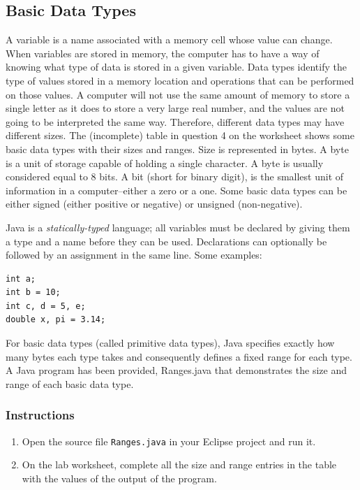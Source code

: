 \documentclass[12pt]{scrartcl}
\begin{document}
\subsection{Basic Data Types}

A variable is a name associated with a memory cell whose value can change. 
When variables are stored in memory, the computer has to have a way of 
knowing what type of data is stored in a given variable.  Data types identify 
the type of values stored in a memory location and operations that can be 
performed on those values.  A computer will not use the same amount of 
memory to store a single letter as it does to store a very large real number, 
and the values are not going to be interpreted the same way.  Therefore, 
different data types may have different sizes. The (incomplete) table in 
question 4 on the worksheet shows some basic data types with their 
sizes and ranges.  Size is represented in bytes.  A byte is a unit of storage 
capable of holding a single character.  A byte is usually considered equal 
to 8 bits.  A bit (short for binary digit), is the smallest unit of information in 
a computer--either a zero or a one.  Some basic data types can be either 
signed (either positive or negative) or unsigned (non-negative).

Java is a \emph{statically-typed} language; all variables must be declared 
by giving them a type and a name before they can be used.  Declarations 
can optionally be followed by an assignment in the same line.  Some 
examples:

\begin{verbatim}
int a;
int b = 10;
int c, d = 5, e;
double x, pi = 3.14;
\end{verbatim}

For basic data types (called primitive data types), Java specifies exactly 
how many bytes each type takes and consequently defines a fixed range 
for each type.  A Java program has been provided, Ranges.java that 
demonstrates the size and range of each basic data type.

\subsubsection*{Instructions}

\begin{enumerate}
  \item Open the source file \texttt{Ranges.java} in your
	Eclipse project and run it.
  \item On the lab worksheet, complete all the size and range entries 
  	in the table with the values of the output of the program. 
\end{enumerate}
\end{document}
